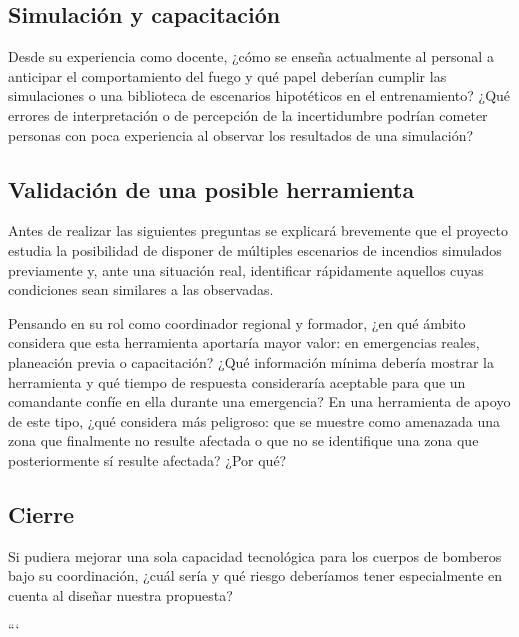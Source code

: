 \subsection{Simulación y capacitación}
\begin{enumerate}
  \pregunta Desde su experiencia como docente, ¿cómo se enseña actualmente al personal a anticipar el comportamiento del fuego y qué papel deberían cumplir las simulaciones o una biblioteca de escenarios hipotéticos en el entrenamiento?
  \pregunta ¿Qué errores de interpretación o de percepción de la incertidumbre podrían cometer personas con poca experiencia al observar los resultados de una simulación?
\end{enumerate}

\subsection{Validación de una posible herramienta}

Antes de realizar las siguientes preguntas se explicará brevemente que el proyecto
estudia la posibilidad de disponer de múltiples escenarios de incendios simulados
previamente y, ante una situación real, identificar rápidamente aquellos cuyas
condiciones sean similares a las observadas.

\begin{enumerate}
  \pregunta Pensando en su rol como coordinador regional y formador, ¿en qué ámbito considera que esta herramienta aportaría mayor valor: en emergencias reales, planeación previa o capacitación?
  \pregunta ¿Qué información mínima debería mostrar la herramienta y qué tiempo de respuesta consideraría aceptable para que un comandante confíe en ella durante una emergencia?
  \pregunta En una herramienta de apoyo de este tipo, ¿qué considera más peligroso: que se muestre como amenazada una zona que finalmente no resulte afectada o que no se identifique una zona que posteriormente sí resulte afectada? ¿Por qué?
\end{enumerate}

\subsection{Cierre}

\begin{enumerate}
  \pregunta Si pudiera mejorar una sola capacidad tecnológica para los cuerpos de bomberos bajo su coordinación, ¿cuál sería y qué riesgo deberíamos tener especialmente en cuenta al diseñar nuestra propuesta?
\end{enumerate}


\clearpage

```